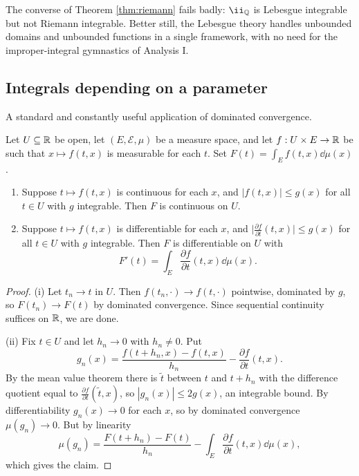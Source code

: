 \documentclass[a4paper]{scrartcl}
\newcommand{\cE}{\mathcal{E}}
\newcommand{\ind}{\ii}
\begin{document}
The converse of Theorem \ref{thm:riemann} fails badly: $\ind_\Q$ is Lebesgue integrable but not Riemann integrable. Better still, the Lebesgue theory handles unbounded domains and unbounded functions in a single framework, with no need for the improper-integral gymnastics of Analysis I.

\subsection{Integrals depending on a parameter}

A standard and constantly useful application of dominated convergence.

\begin{theorem}\label{thm:diff-under}
	Let $U \subseteq \mathbb{R}$ be open, let $(E,\cE,\mu)$ be a measure space, and let $f : U \times E \to \mathbb{R}$ be such that $x \mapsto f(t,x)$ is measurable for each $t$. Set $F(t) = \int_E f(t,x)\dd\mu(x)$.
	\begin{enumerate}[label=(\roman*)]
		\item Suppose $t \mapsto f(t,x)$ is continuous for each $x$, and $|f(t,x)| \leq g(x)$ for all $t \in U$ with $g$ integrable. Then $F$ is continuous on $U$.
		\item Suppose $t\mapsto f(t,x)$ is differentiable for each $x$, and $\big|\frac{\partial f}{\partial t}(t,x)\big| \leq g(x)$ for all $t \in U$ with $g$ integrable. Then $F$ is differentiable on $U$ with
		$$
		F'(t) = \int_E \frac{\partial f}{\partial t}(t,x)\dd\mu(x).
		$$
	\end{enumerate}
\end{theorem}
\begin{proof}
	(i) Let $t_n \to t$ in $U$. Then $f(t_n, \cdot) \to f(t,\cdot)$ pointwise, dominated by $g$, so $F(t_n)\to F(t)$ by dominated convergence. Since sequential continuity suffices on $\mathbb{R}$, we are done.

	(ii) Fix $t \in U$ and let $h_n \to 0$ with $h_n \neq 0$. Put
	$$
	g_n(x) = \frac{f(t+h_n,x)-f(t,x)}{h_n} - \frac{\partial f}{\partial t}(t,x).
	$$
	By the mean value theorem there is $\tilde t$ between $t$ and $t+h_n$ with the difference quotient equal to $\frac{\partial f}{\partial t}(\tilde t, x)$, so $|g_n(x)| \leq 2g(x)$, an integrable bound. By differentiability $g_n(x)\to 0$ for each $x$, so by dominated convergence $\mu(g_n)\to 0$. But by linearity
	$$
	\mu(g_n) = \frac{F(t+h_n)-F(t)}{h_n} - \int_E \frac{\partial f}{\partial t}(t,x)\dd\mu(x),
	$$
	which gives the claim.
\end{proof}
\end{document}
